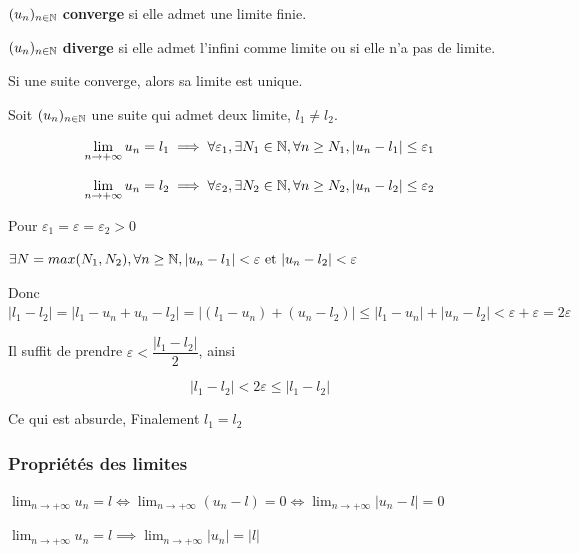 \documentclass[a4paper, 12pt]{article}
\begin{document}
\begin{definition}
    \item $(u_n)_{n \in \mathbb{N}}$ \textbf{converge} si elle admet une limite finie.

    \item $(u_n)_{n \in \mathbb{N}}$ \textbf{diverge} si elle admet l'infini comme limite ou si elle n'a pas de limite.
\end{definition}

\begin{proposition}
    Si une suite converge, alors sa limite est unique.
\end{proposition}

\begin{demonstration}
    Soit $(u_n)_{n \in \mathbb{N}}$ une suite qui admet deux limite, $l_1 \neq l_2$.
    
    $$
    \lim_{n \to +\infty}u_n = l_1 \implies
    \forall \varepsilon_1, \exists N_1 \in \mathbb{N}, \forall n \geq N_1, |u_n - l_1| \leq \varepsilon_1
    $$
    
    $$
    \lim_{n \to +\infty}u_n = l_2 \implies
    \forall \varepsilon_2, \exists N_2 \in \mathbb{N}, \forall n \geq N_2, |u_n - l_2| \leq \varepsilon_2
    $$

    Pour $\varepsilon_1 = \varepsilon = \varepsilon_2 \gt 0$
    
    $\exists N = max(N_1, N_2), \forall n \geq \mathbb{N}, |u_n - l_1| < \varepsilon \text{ et } |u_n - l_2| < \varepsilon$

    Donc $|l_1 - l_2| = |l_1 - u_n + u_n - l_2| = |(l_1 - u_n) + (u_n - l_2)| \leq |l_1 - u_n| + |u_n - l_2| \lt \varepsilon + \varepsilon = 2 \varepsilon$

    Il suffit de prendre $\varepsilon \lt \dfrac{|l_1 - l_2|}{2}$, ainsi

    $$
    |l_1 - l_2| \lt 2\varepsilon \leq |l_1 - l_2|
    $$

    \begin{rdem}
        Ce qui est absurde, Finalement $l_1 = l_2$
    \end{rdem}
\end{demonstration}

\subsubsection{Propriétés des limites}

\begin{proprietes}
    \item $\lim_{n \to +\infty} u_n = l \iff \lim_{n \to +\infty}(u_n - l) = 0 \iff \lim_{n \to +\infty} |u_n - l| = 0$
    \item $\lim_{n \to +\infty} u_n = l \implies \lim_{n \to +\infty}|u_n| = |l|$
\end{proprietes}
\end{document}
